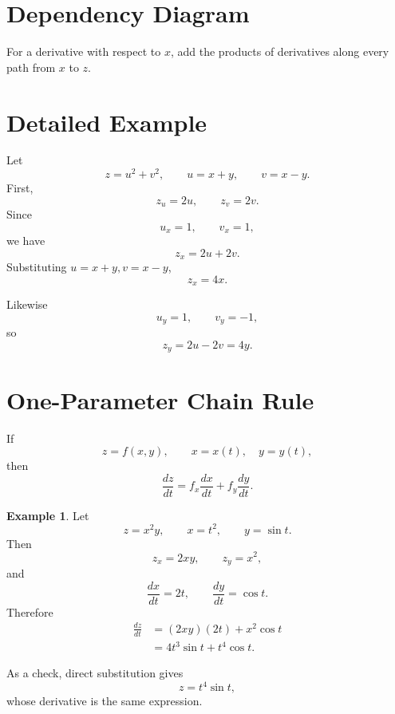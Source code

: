 \documentclass[11pt,oneside]{book}
\theoremstyle{studentthm}
\theoremstyle{definition}
\newtheorem{example}[theorem]{Example}
\begin{document}
\section{Dependency Diagram}

\begin{center}
\end{center}

For a derivative with respect to \(x\), add the products of
derivatives along every path from \(x\) to \(z\).

\section{Detailed Example}

Let
\[
z=u^2+v^2,
\qquad
u=x+y,
\qquad
v=x-y.
\]
First,
\[
z_u=2u,\qquad z_v=2v.
\]
Since
\[
u_x=1,\qquad v_x=1,
\]
we have
\[
z_x=2u+2v.
\]
Substituting \(u=x+y,v=x-y\),
\[
z_x=4x.
\]

Likewise
\[
u_y=1,\qquad v_y=-1,
\]
so
\[
z_y=2u-2v=4y.
\]

\section{One-Parameter Chain Rule}

If
\[
z=f(x,y),
\qquad
x=x(t),\quad y=y(t),
\]
then
\[
\frac{dz}{dt}
=
f_x\frac{dx}{dt}
+
f_y\frac{dy}{dt}.
\]

\begin{example}
Let
\[
z=x^2y,
\qquad
x=t^2,
\qquad
y=\sin t.
\]
Then
\[
z_x=2xy,\qquad z_y=x^2,
\]
and
\[
\frac{dx}{dt}=2t,
\qquad
\frac{dy}{dt}=\cos t.
\]
Therefore
\[
\begin{aligned}
\frac{dz}{dt}
&=
(2xy)(2t)+x^2\cos t\\
&=
4t^3\sin t+t^4\cos t.
\end{aligned}
\]

As a check, direct substitution gives
\[
z=t^4\sin t,
\]
whose derivative is the same expression.
\end{example}
\end{document}
